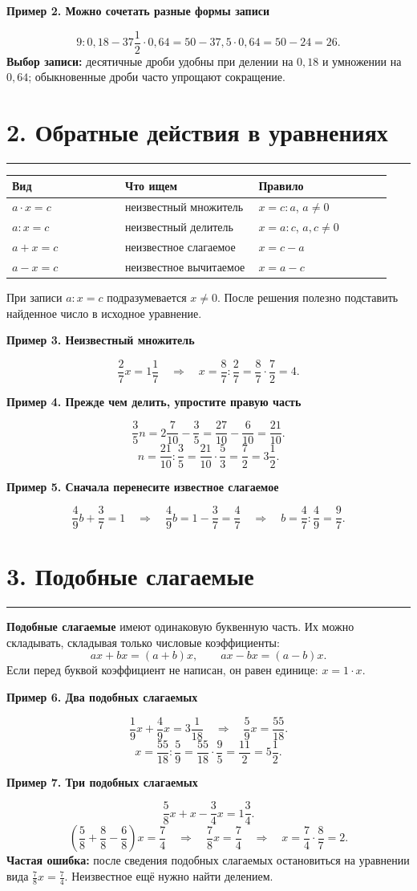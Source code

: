 \documentclass[a4paper,12pt]{article}
\newcommand{\sect}[1]{\section*{#1}\vspace{-3pt}\noindent\textcolor{accent}{\rule{\linewidth}{0.5pt}}\vspace{3pt}}
\newcommand{\key}[1]{\textcolor{darkaccent}{\textbf{#1}}}
\newcommand{\ex}[1]{\medskip\noindent\textcolor{darkaccent}{\textbf{#1}}\par\vspace{-2mm}}
\begin{document}
\ex{Пример 2. Можно сочетать разные формы записи}
\[
9:0{,}18-37\frac12\cdot0{,}64
=50-37{,}5\cdot0{,}64
=50-24=26.
\]
\key{Выбор записи:} десятичные дроби удобны при делении на $0{,}18$ и умножении на $0{,}64$; обыкновенные дроби часто упрощают сокращение.

\sect{2. Обратные действия в уравнениях}
\begin{center}
\begin{tabular}{@{}p{0.28\linewidth}p{0.33\linewidth}p{0.33\linewidth}@{}}
\toprule
\textbf{Вид} & \textbf{Что ищем} & \textbf{Правило} \\
\midrule
$a\cdot x=c$ & неизвестный множитель & $x=c:a$, $a\ne0$ \\
$a:x=c$ & неизвестный делитель & $x=a:c$, $a,c\ne0$ \\
$a+x=c$ & неизвестное слагаемое & $x=c-a$ \\
$a-x=c$ & неизвестное вычитаемое & $x=a-c$ \\
\bottomrule
\end{tabular}
\end{center}
При записи $a:x=c$ подразумевается $x\ne0$. После решения полезно подставить найденное число в исходное уравнение.

\ex{Пример 3. Неизвестный множитель}
\[
\frac27x=1\frac17
\quad\Longrightarrow\quad
x=\frac87:\frac27=\frac87\cdot\frac72=4.
\]

\ex{Пример 4. Прежде чем делить, упростите правую часть}
\[
\frac35n=2\frac7{10}-\frac35
=\frac{27}{10}-\frac6{10}=\frac{21}{10}.
\]
\[
n=\frac{21}{10}:\frac35=\frac{21}{10}\cdot\frac53=\frac72=3\frac12.
\]

\ex{Пример 5. Сначала перенесите известное слагаемое}
\[
\frac49b+\frac37=1
\quad\Longrightarrow\quad
\frac49b=1-\frac37=\frac47
\quad\Longrightarrow\quad
b=\frac47:\frac49=\frac97.
\]
\clearpage

\sect{3. Подобные слагаемые}
\key{Подобные слагаемые} имеют одинаковую буквенную часть. Их можно складывать, складывая только числовые коэффициенты:
\[
ax+bx=(a+b)x,\qquad ax-bx=(a-b)x.
\]
Если перед буквой коэффициент не написан, он равен единице: $x=1\cdot x$.

\ex{Пример 6. Два подобных слагаемых}
\[
\frac19x+\frac49x=3\frac1{18}
\quad\Longrightarrow\quad
\frac59x=\frac{55}{18}.
\]
\[
x=\frac{55}{18}:\frac59
=\frac{55}{18}\cdot\frac95
=\frac{11}{2}=5\frac12.
\]

\ex{Пример 7. Три подобных слагаемых}
\[
\frac58x+x-\frac34x=1\frac34.
\]
\[
\left(\frac58+\frac88-\frac68\right)x=\frac74
\quad\Longrightarrow\quad
\frac78x=\frac74
\quad\Longrightarrow\quad
x=\frac74\cdot\frac87=2.
\]
\key{Частая ошибка:} после сведения подобных слагаемых остановиться на уравнении вида $\frac78x=\frac74$. Неизвестное ещё нужно найти делением.
\end{document}
